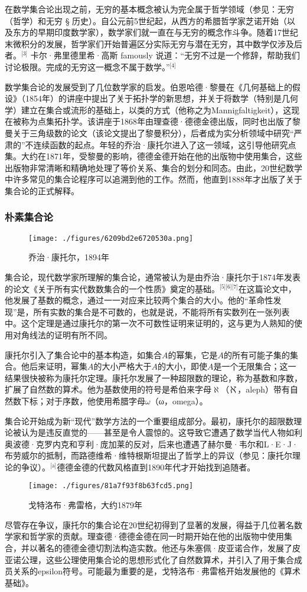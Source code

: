 在数学集合论出现之前，无穷的基本概念被认为完全属于哲学领域（参见：无穷（哲学）和无穷 § 历史）。自公元前5世纪起，从西方的希腊哲学家芝诺开始（以及东方的早期印度数学家），数学家们就一直在与无穷的概念作斗争。随着17世纪末微积分的发展，哲学家们开始普遍区分实际无穷与潜在无穷，其中数学仅涉及后者。\(^\text{[3]}\) 卡尔·弗里德里希·高斯 famously 说道：“无穷不过是一个修辞，帮助我们讨论极限。完成的无穷这一概念不属于数学。”\(^\text{[4]}\)

数学集合论的发展受到了几位数学家的启发。伯恩哈德·黎曼在《几何基础上的假设》（1854年）的讲座中提出了关于拓扑学的新思想，并关于将数学（特别是几何学）建立在集合或流形的基础上，以类的方式（他称之为Mannigfaltigkeit），这现在被称为点集拓扑学。该讲座于1868年由理查德·德德金德出版，同时也出版了黎曼关于三角级数的论文（该论文提出了黎曼积分），后者成为实分析领域中研究“严肃的”不连续函数的起点。年轻的乔治·康托尔进入了这一领域，这引导他研究点集。大约在1871年，受黎曼的影响，德德金德开始在他的出版物中使用集合，这些出版物非常清晰和精确地处理了等价关系、集合的划分和同态。由此，20世纪数学中许多常见的集合论程序可以追溯到他的工作。然而，他直到1888年才出版了关于集合论的正式解释。
\subsubsection{朴素集合论}
\begin{figure}[ht]
\centering
\texttt{[image: ./figures/6209bd2e6720530a.png]}
\caption{乔治·康托尔，1894年} \label{fig_Set1_3}
\end{figure}
集合论，现代数学家所理解的集合论，通常被认为是由乔治·康托尔于1874年发表的论文《关于所有实代数数集合的一个性质》奠定的基础。\(^\text{[5][6][7]}\)在这篇论文中，他发展了基数的概念，通过一一对应来比较两个集合的大小。他的“革命性发现”是，所有实数的集合是不可数的，也就是说，不能将所有实数列在一张列表中。这个定理是通过康托尔的第一次不可数性证明来证明的，这与更为人熟知的使用对角线法的证明有所不同。

康托尔引入了集合论中的基本构造，如集合$A$的幂集，它是$A$的所有可能子集的集合。他后来证明，幂集$A$的大小严格大于$A$的大小，即使$A$是一个无限集合；这一结果很快被称为康托尔定理。康托尔发展了一种超限数的理论，称为基数和序数，扩展了自然数的算术。他为基数使用的符号是希伯来字母$\aleph$（ℵ，aleph）带有自然数下标；对于序数，他使用希腊字母$\omega$（ω，omega）。

集合论开始成为新“现代”数学方法的一个重要组成部分。最初，康托尔的超限数理论被认为是违反直觉的——甚至是令人震惊的。这导致它遭遇了数学当代人物如利奥波德·克罗内克和亨利·庞加莱的反对，后来也遭遇了赫尔曼·韦尔和L·E·J·布劳威尔的抵制，而路德维希·维特根斯坦提出了哲学上的异议（参见：康托尔理论的争议）。\(^\text{[a]}\)德德金德的代数风格直到1890年代才开始找到追随者。
\begin{figure}[ht]
\centering
\texttt{[image: ./figures/81a7f93f8b63fcd5.png]}
\caption{戈特洛布·弗雷格，大约1879年} \label{fig_Set1_4}
\end{figure}
尽管存在争议，康托尔的集合论在20世纪初得到了显著的发展，得益于几位著名数学家和哲学家的贡献。理查德·德德金德在同一时期开始在他的出版物中使用集合，并以著名的德德金德切割法构造实数。他还与朱塞佩·皮亚诺合作，发展了皮亚诺公理，这些公理使用集合论的思想形式化了自然数算术，并引入了用于集合成员关系的epsilon符号。可能最为重要的是，戈特洛布·弗雷格开始发展他的《算术基础》。


